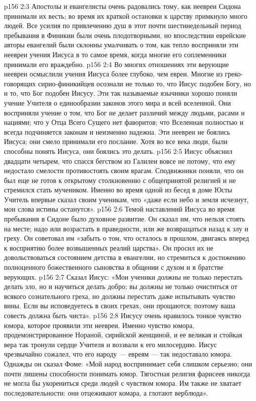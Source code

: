\vs p156 2:3 Апостолы и евангелисты очень радовались тому, как неевреи Сидона принимали их весть; во время их краткой остановки к царству примкнуло много людей. Все усилия по привлечению душ в этот почти шестинедельный период пребывания в Финикии были очень плодотворными, но впоследствии еврейские авторы евангелий были склонны умалчивать о том, как тепло восприняли эти неевреи учения Иисуса в то самое время, когда многие его соплеменники принимали его враждебно.
\vs p156 2:4 Во многих отношениях эти верующие неевреи осмыслили учения Иисуса более глубоко, чем евреи. Многие из греко\hyp{}говорящих сирио\hyp{}финикийцев осознали не только то, что Иисус подобен Богу, но и то, что Бог подобен Иисусу. Эти так называемые язычники хорошо поняли учение Учителя о единообразии законов этого мира и всей вселенной. Они восприняли учение о том, что Бог не делает различий между людьми, расами и нациями; что у Отца Всего Сущего нет фаворитов; что Вселенная полностью и всегда подчиняется законам и неизменно надежна. Эти неевреи не боялись Иисуса; они смело принимали его послание. Хотя во все века люди, были способны понять Иисуса, они боялись это делать.
\vs p156 2:5 \pc Иисус объяснил двадцати четырем, что спасся бегством из Галилеи вовсе не потому, что ему недостало смелости противостоять своим врагам. Сподвижники поняли, что он был еще не готов к открытому столкновению с общепринятой религией и не стремился стать мучеником. Именно во время одной из бесед в доме Юсты Учитель впервые сказал своим ученикам, что «даже если небо и земля исчезнут, мои слова истины останутся».
\vs p156 2:6 \pc Темой наставлений Иисуса во время пребывания в Сидоне было духовное развитие. Он сказал им, что нельзя стоять на месте; надо или возрастать в праведности, или же возвращаться назад к злу и греху. Он советовал им «забыть о том, что осталось в прошлом, двигаясь вперед к восприятию более возвышенных реалий царства». Он просил их не довольствоваться состоянием детства в евангелии, но стремиться к достижению полноценного божественного сыновства в общении с духом и в братстве верующих.
\vs p156 2:7 Сказал Иисус: «Мои ученики должны не только перестать делать зло, но и научиться делать добро; вы должны не только очиститься от всякого сознательного греха, но должны перестать даже испытывать чувство вины. Если вы исповедуетесь в своих грехах, они прощаются; поэтому ваша совесть должна быть чиста».
\vs p156 2:8 Иисусу очень нравилось тонкое чувство юмора, которое проявили эти неевреи. Именно чувство юмора, продемонстрированное Нораной, сирийской женщиной, и ее великая и стойкая вера так тронули сердце Учителя и воззвали к его милосердию. Иисус чрезвычайно сожалел, что его народу --- евреям --- так недоставало юмора. Однажды он сказал Фоме: «Мой народ воспринимает себя слишком серьезно; они почти лишены способности понимать юмор. Тягостная религия фарисеев никогда не могла бы укорениться среди людей с чувством юмора. Им также не хватает последовательности: они отцеживают комара, а глотают верблюда».
